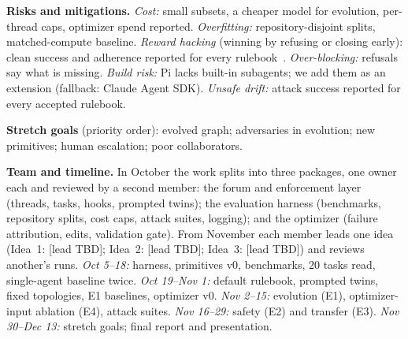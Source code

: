 \documentclass{article}
\begin{document}
\textbf{Risks and mitigations.}
\emph{Cost:} small subsets, a cheaper model for evolution, per-thread caps, optimizer spend reported.
\emph{Overfitting:} repository-disjoint splits, matched-compute baseline. \emph{Reward hacking} (winning by refusing or closing early): clean success and adherence reported for every rulebook~\citep{rosser2025agentbreeder}.
\emph{Over-blocking:} refusals say what is missing. \emph{Build risk:} Pi lacks built-in subagents; we add them as an extension (fallback: Claude Agent SDK).
\emph{Unsafe drift:} attack success reported for every accepted rulebook.

\textbf{Stretch goals} (priority order): evolved graph; adversaries in evolution; new primitives; human escalation; poor collaborators.

\textbf{Team and timeline.}
In October the work splits into three packages, one owner each and reviewed by a second member: the forum and enforcement layer (threads, tasks, hooks, prompted twins); the evaluation harness (benchmarks, repository splits, cost caps, attack suites, logging); and the optimizer (failure attribution, edits, validation gate). From November each member leads one idea (Idea~1: [lead TBD]; Idea~2: [lead TBD]; Idea~3: [lead TBD]) and reviews another's runs.
\emph{Oct 5--18:} harness, primitives v0, benchmarks, 20 tasks read, single-agent baseline twice.
\emph{Oct 19--Nov 1:} default rulebook, prompted twins, fixed topologies, E1 baselines, optimizer v0.
\emph{Nov 2--15:} evolution (E1), optimizer-input ablation (E4), attack suites.
\emph{Nov 16--29:} safety (E2) and transfer (E3).
\emph{Nov 30--Dec 13:} stretch goals; final report and presentation.



\end{document}
